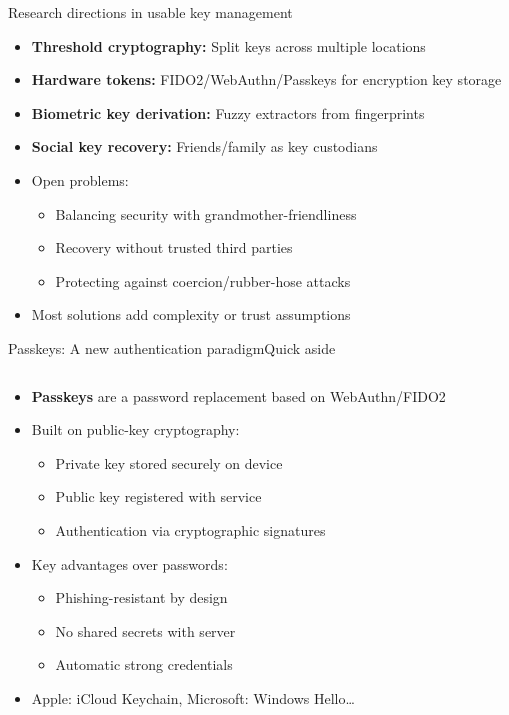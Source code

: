 \documentclass[aspectratio=169, lualatex, handout]{beamer}
\begin{document}
\begin{frame}{Research directions in usable key management}
	\begin{itemize}
		\item \textbf{Threshold cryptography:} Split keys across multiple locations
		\item \textbf{Hardware tokens:} FIDO2/WebAuthn/Passkeys for encryption key storage
		\item \textbf{Biometric key derivation:} Fuzzy extractors from fingerprints
		\item \textbf{Social key recovery:} Friends/family as key custodians
		\item Open problems:
		      \begin{itemize}
			      \item Balancing security with grandmother-friendliness
			      \item Recovery without trusted third parties
			      \item Protecting against coercion/rubber-hose attacks
		      \end{itemize}
		\item Most solutions add complexity or trust assumptions
	\end{itemize}
\end{frame}

\begin{frame}{Passkeys: A new authentication paradigm}{Quick aside}
	\begin{columns}[c]
		\begin{column}{0.6\textwidth}
			\begin{itemize}
				\item \textbf{Passkeys} are a password replacement based on WebAuthn/FIDO2
				\item Built on public-key cryptography:
				      \begin{itemize}
					      \item Private key stored securely on device
					      \item Public key registered with service
					      \item Authentication via cryptographic signatures
				      \end{itemize}
				\item Key advantages over passwords:
				      \begin{itemize}
					      \item Phishing-resistant by design
					      \item No shared secrets with server
					      \item Automatic strong credentials
				      \end{itemize}
				\item Apple: iCloud Keychain, Microsoft: Windows Hello\ldots
			\end{itemize}
		\end{column}
		\begin{column}{0.4\textwidth}
		\end{column}
	\end{columns}
\end{frame}
\end{document}
